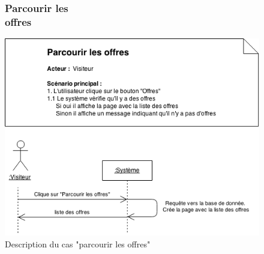 \documentclass[12pt]{report}
\begin{document}
\begin{figure}[!h]
\centering
\subsubsection{Parcourir les offres~~~~~~~~~~~~~~~~~~~~~~~~~~~~~~~~~~~~~~~}
\includegraphics[width=1.\textwidth]{./ressources/desc_UC_parcourir_offres.png}
\caption{Description du cas "parcourir les offres"}
\end{figure}
\clearpage
\end{document}

